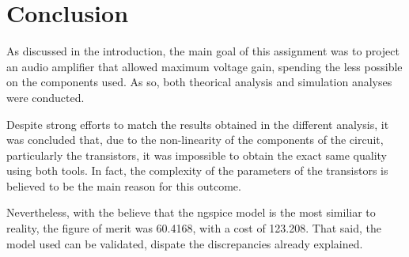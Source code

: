 \pagebreak
\section{Conclusion}
\label{con}

\par As discussed in the introduction, the main goal of this assignment was to project an audio amplifier that allowed maximum voltage gain, spending the less possible on the components used. As so, both theorical analysis and simulation analyses were conducted. 

\par Despite strong efforts to match the results obtained in the different analysis, it was concluded that, due to the non-linearity of the components of the circuit, particularly the transistors, it was impossible to obtain the exact same quality using both tools. In fact, the complexity of the parameters of the transistors is believed to be the main reason for this outcome.

\PAR Nevertheless, with the believe that the ngspice model is the most similiar to reality, the figure of merit was 60.4168, with a cost of 123.208. That said, the model used can be validated, dispate the discrepancies already explained.


